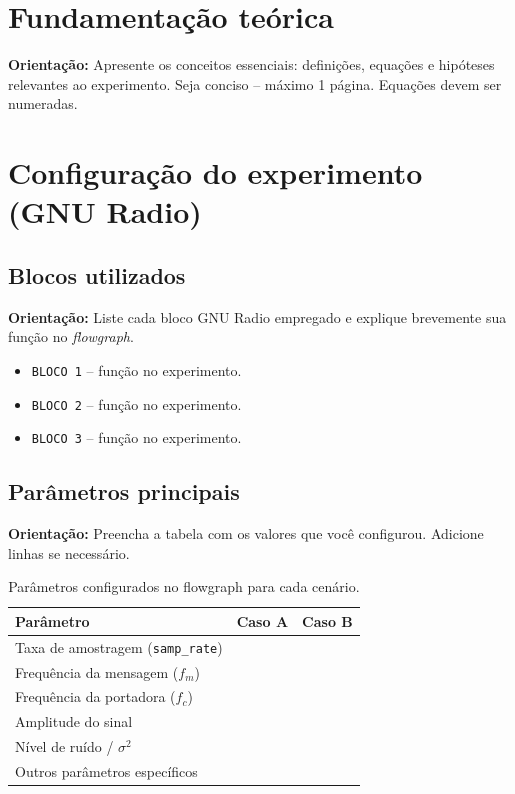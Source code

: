 \documentclass[12pt,a4paper]{article}
\newcommand{\dica}[1]{%
  \par\vspace{0.3em}%
  \noindent\colorbox{gray!15}{\parbox{0.97\linewidth}{\small\textbf{Orientação:} #1}}%
  \par\vspace{0.3em}%
}
\begin{document}
\vspace{4cm}

\section{Fundamentação teórica}
\dica{Apresente os conceitos essenciais: definições, equações e hipóteses
relevantes ao experimento. Seja conciso -- máximo 1 página. Equações devem
ser numeradas.}

\vspace{7cm}

\section{Configuração do experimento (GNU Radio)}

\subsection{Blocos utilizados}
\dica{Liste cada bloco GNU Radio empregado e explique brevemente sua função
no \textit{flowgraph}.}

\begin{itemize}
  \item \texttt{BLOCO 1} -- função no experimento.
  \item \texttt{BLOCO 2} -- função no experimento.
  \item \texttt{BLOCO 3} -- função no experimento.
\end{itemize}

\subsection{Parâmetros principais}
\dica{Preencha a tabela com os valores que você configurou. Adicione linhas
se necessário.}

\begin{table}[H]
  \centering
  \begin{tabular}{l c c}
    \toprule
    \textbf{Parâmetro} & \textbf{Caso A} & \textbf{Caso B} \\
    \midrule
    Taxa de amostragem (\texttt{samp\_rate})  &  &  \\
    Frequência da mensagem ($f_m$)            &  &  \\
    Frequência da portadora ($f_c$)           &  &  \\
    Amplitude do sinal                        &  &  \\
    Nível de ruído / $\sigma^2$               &  &  \\
    Outros parâmetros específicos             &  &  \\
    \bottomrule
  \end{tabular}
  \caption{Parâmetros configurados no flowgraph para cada cenário.}
\end{table}
\end{document}
